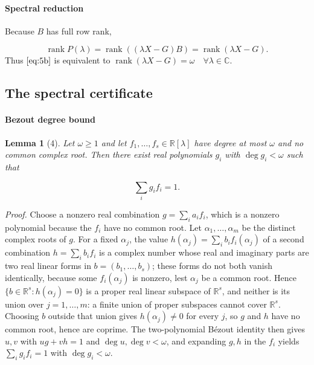 \documentclass[journal]{IEEEtran}
\theoremstyle{plainn}
\newtheorem*{lem}{Lemma}
\begin{document}
\paragraph*{Spectral reduction}\label{sec:spectral}
Because $B$ has full row rank,

\begin{equation}
\operatorname{rank}P(\lambda)=\operatorname{rank}((\lambda X-G)B)
=\operatorname{rank}(\lambda X-G).
\end{equation}
Thus $\eqref{eq:5b}$ is equivalent to $\operatorname{rank}(\lambda X-G)=\omega\quad\forall\lambda\in\mathbb C$.


\subsection{The spectral certificate}\label{sec:spectrum}
\paragraph*{Bezout degree bound}\label{sec:bezout}
\begin{lem}[4] Let $\omega\ge1$ and let $f_1,\ldots,f_s\in\mathbb R[\lambda]$ have degree at most $\omega$ and no common complex root. Then there exist real polynomials $g_i$ with $\deg g_i<\omega$ such that

\begin{equation}
\sum_i g_i f_i=1.
\end{equation}
\end{lem}
\emph{Proof.} Choose a nonzero real combination $g=\sum_i a_if_i$, which is a nonzero
polynomial because the $f_i$ have no common root. Let $\alpha_1,\dots,\alpha_m$ be the
distinct complex roots of $g$. For a fixed $\alpha_j$, the value
$h(\alpha_j)=\sum_i b_if_i(\alpha_j)$ of a second combination $h=\sum_i b_if_i$ is a
complex number whose real and imaginary parts are two real linear forms in
$b=(b_1,\dots,b_s)$; these forms do not both vanish identically, because some
$f_i(\alpha_j)$ is nonzero, lest $\alpha_j$ be a common root. Hence
$\{b\in\mathbb R^s:h(\alpha_j)=0\}$ is a proper real linear subspace of $\mathbb R^s$,
and neither is its union over $j=1,\dots,m$: a finite union of proper subspaces cannot
cover $\mathbb R^s$. Choosing $b$ outside that union gives $h(\alpha_j)\neq0$ for every
$j$, so $g$ and $h$ have no common root, hence are coprime. The two-polynomial
B\'ezout identity then gives $u,v$ with $ug+vh=1$ and $\deg u,\deg v<\omega$, and
expanding $g,h$ in the $f_i$ yields $\sum_ig_if_i=1$ with $\deg g_i<\omega$.
\end{document}
